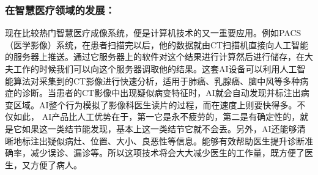 \documentclass{article}
\begin{document}
\subsubsection{在智慧医疗领域的发展：}\par
现在比较热门智慧医疗成像系统，便是计算机技术的又一重要应用。例如PACS（医学影像）系统，在患者扫描完以后，他的数据就由CT扫描机直接向人工智能的服务器上推送。通过它服务器上的软件对这个结果进行计算然后进行储存，在大夫工作的时候我们可以向这个服务器调取他的结果。这套AI设备可以利用人工智能算法对采集到的CT影像进行快速分析，适用于肺癌、乳腺癌、脑中风等多种病症的诊断。当患者的CT影像中出现疑似病变特征时，AI就会自动发现并标注出病变区域。AI整个行为模拟了影像科医生读片的过程，而在速度上则要快得多。不仅如此， AI产品比人工优势在于，第一它是永不疲劳的，第二是有确定性的，就是它如果这一类结节能发现，基本上这一类结节它就不会丢。另外，AI还能够清晰地标注出疑似病灶、位置、大小、良恶性等信息。能够有效帮助医生提升诊断准确率，减少误诊、漏诊等。所以这项技术将会大大减少医生的工作量，既方便了医生，又方便了病人。
\end{document}
